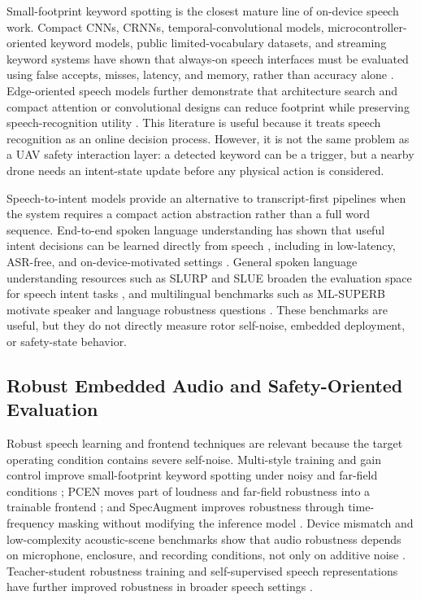 Small-footprint keyword spotting is the closest mature line of on-device speech work. Compact CNNs, CRNNs, temporal-convolutional models, microcontroller-oriented keyword models, public limited-vocabulary datasets, and streaming keyword systems have shown that always-on speech interfaces must be evaluated using false accepts, misses, latency, and memory, rather than accuracy alone \cite{sainath2015cnn_kws,arik2017crnn_kws,choi2019tcresnet,warden2018speechcommands,zhang2017helloedge,rybakov2020streamingkws}. Edge-oriented speech models further demonstrate that architecture search and compact attention or convolutional designs can reduce footprint while preserving speech-recognition utility \cite{lin2018edgespeechnets,wong2020tinyspeech}. This literature is useful because it treats speech recognition as an online decision process. However, it is not the same problem as a UAV safety interaction layer: a detected keyword can be a trigger, but a nearby drone needs an intent-state update before any physical action is considered.

Speech-to-intent models provide an alternative to transcript-first pipelines when the system requires a compact action abstraction rather than a full word sequence. End-to-end spoken language understanding has shown that useful intent decisions can be learned directly from speech \cite{lugosch19_interspeech,kuo20_interspeech,mhiri20_interspeech}, including in low-latency, ASR-free, and on-device-motivated settings \cite{haghani2018audio_semantics,ijcai2021p538,le2022deliberation}. General spoken language understanding resources such as SLURP and SLUE broaden the evaluation space for speech intent tasks \cite{bastianelli-etal-2020-slurp,shon2022slue}, and multilingual benchmarks such as ML-SUPERB motivate speaker and language robustness questions \cite{shi23g_interspeech}. These benchmarks are useful, but they do not directly measure rotor self-noise, embedded deployment, or safety-state behavior.

\subsection{Robust Embedded Audio and Safety-Oriented Evaluation}

Robust speech learning and frontend techniques are relevant because the target operating condition contains severe self-noise. Multi-style training and gain control improve small-footprint keyword spotting under noisy and far-field conditions \cite{prabhavalkar2015agc}; PCEN moves part of loudness and far-field robustness into a trainable frontend \cite{wang2017pcen}; and SpecAugment improves robustness through time-frequency masking without modifying the inference model \cite{park2019specaugment}. Device mismatch and low-complexity acoustic-scene benchmarks show that audio robustness depends on microphone, enclosure, and recording conditions, not only on additive noise \cite{heittola2020dcase,schmid2024dcase}. Teacher-student robustness training and self-supervised speech representations have further improved robustness in broader speech settings \cite{park2020improvednoisystudent,baevski2020wav2vec20,yang21c_interspeech}.

